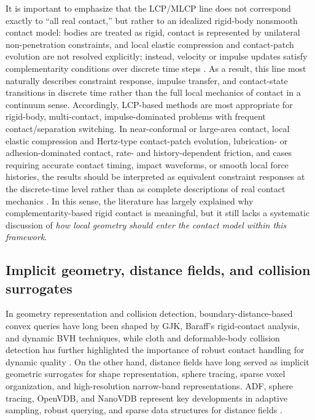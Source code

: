 It is important to emphasize that the LCP/MLCP line does not correspond exactly to ``all real contact,'' but rather to an idealized rigid-body nonsmooth contact model: bodies are treated as rigid, contact is represented by unilateral non-penetration constraints, and local elastic compression and contact-patch evolution are not resolved explicitly; instead, velocity or impulse updates satisfy complementarity conditions over discrete time steps \cite{jean1999nonsmooth,stewart1996implicit,anitescu1997formulating,contacttutorial2016,flores2022contact,wang2021nonsmooth}. As a result, this line most naturally describes constraint response, impulse transfer, and contact-state transitions in discrete time rather than the full local mechanics of contact in a continuum sense. Accordingly, LCP-based methods are most appropriate for rigid-body, multi-contact, impulse-dominated problems with frequent contact/separation switching. In near-conformal or large-area contact, local elastic compression and Hertz-type contact-patch evolution, lubrication- or adhesion-dominated contact, rate- and history-dependent friction, and cases requiring accurate contact timing, impact waveforms, or smooth local force histories, the results should be interpreted as equivalent constraint responses at the discrete-time level rather than as complete descriptions of real contact mechanics \cite{pazouki2017compliant,contactpatch2018,nencioni2025conformal}. In this sense, the literature has largely explained why complementarity-based rigid contact is meaningful, but it still lacks a systematic discussion of \emph{how local geometry should enter the contact model within this framework}.

\subsection{Implicit geometry, distance fields, and collision surrogates}
In geometry representation and collision detection, boundary-distance-based convex queries have long been shaped by GJK, Baraff's rigid-contact analysis, and dynamic BVH techniques, while cloth and deformable-body collision detection has further highlighted the importance of robust contact handling for dynamic quality \cite{gilbert1988fast,baraff1989analytical,baraff1994fast,larsson2006dbvh,bridson2002robust,teschner2005collision,wang2021collision}. On the other hand, distance fields have long served as implicit geometric surrogates for shape representation, sphere tracing, sparse voxel organization, and high-resolution narrow-band representations. ADF, sphere tracing, OpenVDB, and NanoVDB represent key developments in adaptive sampling, robust querying, and sparse data structures for distance fields \cite{frisken2000adf,hart1996sphere,museth2013vdb,museth2021nanovdb}.


